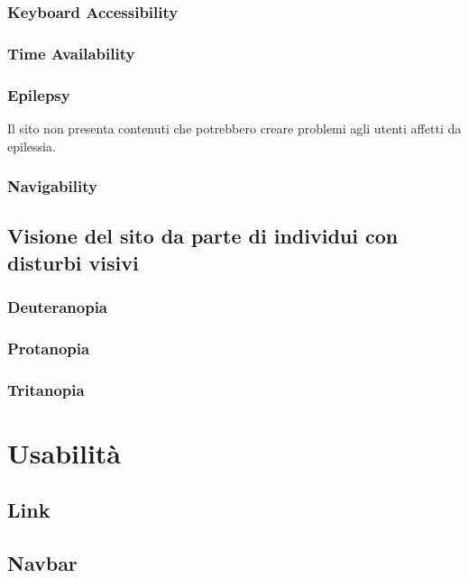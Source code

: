 \documentclass[10pt, a4paper]{article}
\begin{document}
\subsubsection{Keyboard Accessibility}

\subsubsection{Time Availability}

\subsubsection{Epilepsy}
Il sito non presenta contenuti che potrebbero creare problemi agli utenti affetti da epilessia.

\subsubsection{Navigability}

\subsection{Visione del sito da parte di individui con disturbi visivi}

\subsubsection{Deuteranopia}

\subsubsection{Protanopia}

\subsubsection{Tritanopia}

\section{Usabilità}

\subsection{Link}

\subsection{Navbar}
\end{document}
